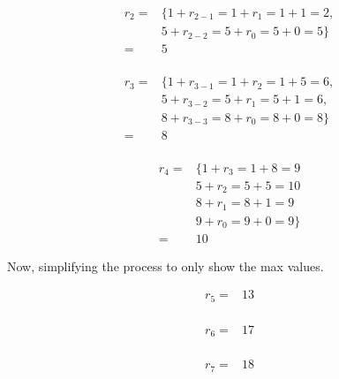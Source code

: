 \documentclass{article}
\begin{document}
\begin{equation*} \label{rc2}
\begin{split}
r_2 = & \{ 1+r_{2-1}=1+r_1=1+1=2, \\
      & 5+r_{2-2}=5+r_0=5+0=5\} \\
    = & 5 \\
\end{split}
\end{equation*}

\begin{equation*} \label{rc3}
\begin{split}
r_3 = & \{ 1+r_{3-1}=1+r_2=1+5=6, \\
      & 5+r_{3-2}=5+r_1=5+1=6, \\
      & 8+r_{3-3}=8+r_0=8+0=8 \}\\
    = & 8 \\
\end{split}
\end{equation*}

\begin{equation*} \label{rc4}
\begin{split}
r_4 = & \{ 1+r_3=1+8=9 \\
      & 5+r_2=5+5=10 \\
      & 8+r_1=8+1=9 \\
      & 9+r_0=9+0=9\} \\
    = & 10
\end{split}
\end{equation*}

Now, simplifying the process to only show the max values.

\begin{equation*} \label{rc5}
\begin{split}
r_5 = & 13\\
\end{split}
\end{equation*}

\begin{equation*} \label{rc6}
\begin{split}
r_6 = & 17\\
\end{split}
\end{equation*}

\begin{equation*} \label{rc7}
\begin{split}
r_7 = & 18\\
\end{split}
\end{equation*}
\end{document}
